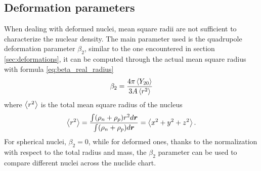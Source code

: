 \subsection{Deformation parameters}
When dealing with deformed nuclei, mean square radii are not sufficient to characterize the nuclear density. The main parameter used is the quadrupole deformation parameter $\beta_2$, similar to the one encountered in section \ref{sec:deformations}, it can be computed through the actual mean square radius with formula \eqref{eq:beta_real_radius}
\begin{equation}
    \label{eq:beta_real_radius}
    \beta_2 = \frac{4\pi\expval{Y_{2 0}}}{3A\expval{r^2}}
\end{equation}
where $\expval{r^2}$ is the total mean square radius of the nucleus 
\begin{equation}
    \expval{r^2} = \frac{\int (\rho_n + \rho_p )r^2 d\bm r}{\int (\rho_n + \rho_p )d\bm r} = \expval{x^2+y^2+z^2}.
\end{equation}
For spherical nuclei, $\beta_2 = 0$, while for deformed ones, thanks to the normalization with respect to the total radius and mass, the $\beta_2$ parameter can be used to compare different nuclei across the nuclide chart.